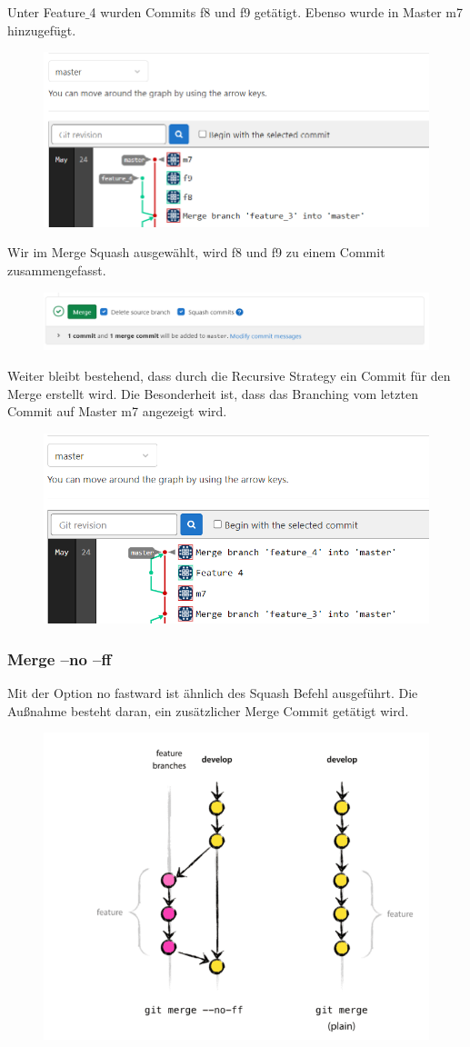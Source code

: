 Unter Feature$\_$4 wurden Commits f8 und f9 getätigt. Ebenso wurde in Master m7 hinzugefügt.
\begin{figure}[H]
	\centering
	\includegraphics[width=0.7\linewidth]{attachment/chapter_5/Scc034}
\end{figure}
Wir im Merge Squash ausgewählt, wird f8 und f9 zu einem Commit zusammengefasst.
\begin{figure}[H]
	\centering
	\includegraphics[width=0.7\linewidth]{attachment/chapter_5/Scc035}
\end{figure}
Weiter bleibt bestehend, dass durch die Recursive Strategy ein Commit für den Merge erstellt wird. Die Besonderheit ist, dass das Branching vom letzten Commit auf Master m7 angezeigt wird.
\begin{figure}[H]
	\centering
	\includegraphics[width=0.7\linewidth]{attachment/chapter_5/Scc036}
\end{figure}

\subsubsection{Merge --no --ff}
Mit der Option no fastward ist ähnlich des Squash Befehl ausgeführt. Die Außnahme besteht daran, ein zusätzlicher Merge Commit getätigt wird.
    \begin{figure}[H]
    	\centering
    	\includegraphics[width=0.7\linewidth]{attachment/chapter_5/Scc037}
    \end{figure}


